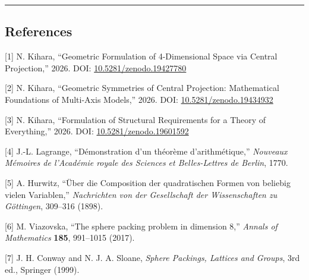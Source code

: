\documentclass[a4paper,11pt]{article}
\begin{document}
\begin{center}\rule{0.5\linewidth}{0.5pt}\end{center}

\subsection{References}\label{references}

{[}1{]} N. Kihara, ``Geometric Formulation of 4-Dimensional Space via
Central Projection,'' 2026. DOI:
\href{https://doi.org/10.5281/zenodo.19427780}{10.5281/zenodo.19427780}

{[}2{]} N. Kihara, ``Geometric Symmetries of Central Projection:
Mathematical Foundations of Multi-Axis Models,'' 2026. DOI:
\href{https://doi.org/10.5281/zenodo.19434932}{10.5281/zenodo.19434932}

{[}3{]} N. Kihara, ``Formulation of Structural Requirements for a Theory
of Everything,'' 2026. DOI:
\href{https://doi.org/10.5281/zenodo.19601592}{10.5281/zenodo.19601592}

{[}4{]} J.-L. Lagrange, ``Démonstration d'un théorème d'arithmétique,''
\emph{Nouveaux Mémoires de l'Académie royale des Sciences et
Belles-Lettres de Berlin}, 1770.

{[}5{]} A. Hurwitz, ``Über die Composition der quadratischen Formen von
beliebig vielen Variablen,'' \emph{Nachrichten von der Gesellschaft der
Wissenschaften zu Göttingen}, 309--316 (1898).

{[}6{]} M. Viazovska, ``The sphere packing problem in dimension 8,''
\emph{Annals of Mathematics} \textbf{185}, 991--1015 (2017).

{[}7{]} J. H. Conway and N. J. A. Sloane, \emph{Sphere Packings,
Lattices and Groups}, 3rd ed., Springer (1999).
\end{document}
